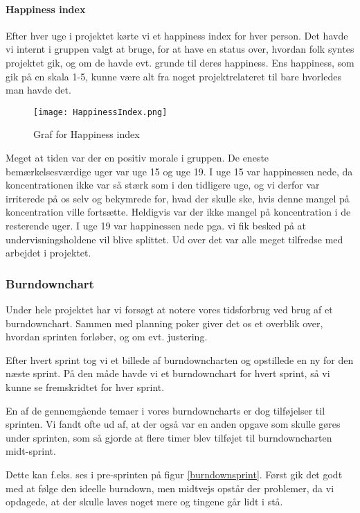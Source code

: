 \paragraph*{Happiness index}
Efter hver uge i projektet kørte vi et happiness index for hver person.
Det havde vi internt i gruppen valgt at bruge, for at have en status over, hvordan folk syntes projektet gik, og om de havde evt. grunde til deres happiness.
Ens happiness, som gik på en skala 1-5, kunne være alt fra noget projektrelateret til bare hvorledes man havde det.

\begin{figure}[h]
    \caption{Graf for Happiness index}
    \centering
        \texttt{[image: HappinessIndex.png]}
    \label{happinessindex}
\end{figure}

Meget at tiden var der en positiv morale i gruppen.
De eneste bemærkelsesværdige uger var uge 15 og uge 19.
I uge 15 var happinessen nede, da koncentrationen ikke var så stærk som i den tidligere uge, og vi derfor var irriterede på os selv og bekymrede for, hvad der skulle ske, hvis denne mangel på koncentration ville fortsætte.
Heldigvis var der ikke mangel på koncentration i de resterende uger.
I uge 19 var happinessen nede pga. vi fik besked på at undervisningsholdene vil blive splittet.
Ud over det var alle meget tilfredse med arbejdet i projektet.

\subsubsection{Burndownchart}

Under hele projektet har vi forsøgt at notere vores tidsforbrug ved brug af et burndownchart.
Sammen med planning poker giver det os et overblik over, hvordan sprinten forløber, og om evt. justering. 

Efter hvert sprint tog vi et billede af burndowncharten og opstillede en ny for den næste sprint.
På den måde havde vi et burndownchart for hvert sprint, så vi kunne se fremskridtet for hver sprint.

En af de gennemgående temaer i vores burndowncharts er dog tilføjelser til sprinten.
Vi fandt ofte ud af, at der også var en anden opgave som skulle gøres under sprinten, som så gjorde at flere timer blev tilføjet til burndowncharten midt-sprint. 

Dette kan f.eks. ses i pre-sprinten på figur \ref{burndownsprint}.
Først gik det godt med at følge den ideelle burndown, men midtvejs opstår der problemer, da vi opdagede, at der skulle laves noget mere og tingene går lidt i stå.

